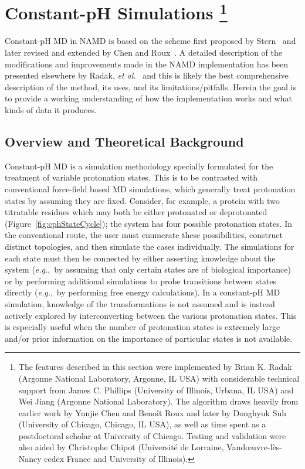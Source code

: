 \newcommand{\pKa}{\text{p}K_{\text{a}}}
\newcommand{\pKaX}[1]{\text{p}K_{\text{a}}^{\text{#1}}}

\section{
Constant-pH Simulations
\footnote[1]{
The features described in this section were implemented by Brian K. Radak 
  (Argonne National Laboratory, Argonne, IL USA) with considerable technical 
  support from James C. Phillips (University of Illinois, Urbana, IL USA) and
  Wei Jiang (Argonne National Laboratory).
The algorithm draws heavily from earlier work by Yunjie Chen and Beno{\^i}t
  Roux and later by Donghyuk Suh (University of Chicago, Chicago, IL USA), as
  well as time spent as a postdoctoral scholar at University of Chicago.
Testing and validation were also aided by Christophe Chipot
  (Universit\'{e} de Lorraine, Vand{\oe}uvre-l\`{e}s-Nancy cedex France and
  University of Illinois).
}
}
\label{section:constantph}

Constant-pH MD in NAMD is based on the scheme first proposed by
  Stern~\cite{Stern_JChemPhys_2007_v126_p164112} and later revised and extended
  by Chen and Roux~\cite{Chen_JChemTheoryComput_2015_v11_p3919}.
A detailed description of the modifications and improvements made in the NAMD
  implementation has been presented elsewhere by Radak,
  \textit{et al.}~\cite{Radak_cpH_2017} and this is likely the best
  comprehensive description of the method, its uses, and its
  limitations/pitfalls.
Herein the goal is to provide a working understanding of how the implementation
  works and what kinds of data it produces.

\subsection{Overview and Theoretical Background}

Constant-pH MD is a simulation methodology specially formulated for the
  treatment of variable protonation states.
This is to be contrasted with conventional force-field based MD simulations,
  which generally treat protonation states by assuming they are fixed.
Consider, for example, a protein with two titratable residues which may both be
  either protonated or deprotonated (Figure~\ref{fig:cphStateCycle});
the system has four possible protonation states.
In the conventional route, the user must enumerate these possibilities,
  construct distinct topologies, and then simulate the cases individually.
The simulations for each state must then be connected by either asserting
  knowledge about the system (\textit{e.g.},~by assuming that only certain
  states are of biological importance) or by performing additional simulations
  to probe transitions between states directly (\textit{e.g.},~by performing
  free energy calculations).
In a constant-pH MD simulation, knowledge of the transformations is not
  assumed and is instead actively explored by interconverting between the
  various protonation states.
This is especially useful when the number of protonation states is extremely
  large and/or prior information on the importance of particular states is
  not available.

